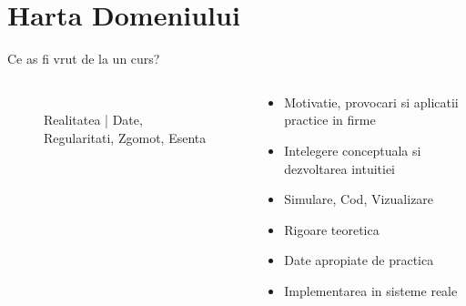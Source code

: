 \documentclass{beamer}
\begin{document}
\section{Harta Domeniului}

\begin{frame}[t]{Ce as fi vrut de la un curs?}

	\begin{columns}
	\begin{column}{0.5\textwidth}	
		\begin{figure}[h]
		\\ Realitatea | Date, Regularitati, Zgomot, Esenta
	\end{figure}
	\end{column}
	
	\begin{column}{0.5\textwidth}	
		\begin{itemize}
		\item Motivatie, provocari si aplicatii practice in firme
		\item Intelegere conceptuala si dezvoltarea intuitiei
		\item Simulare, Cod, Vizualizare
		\item Rigoare teoretica
		\item Date apropiate de practica
		\item Implementarea in sisteme reale
	\end{itemize}	
	\end{column}
	\end{columns}
	
\end{frame}
%
%
%
%
%
\end{document}
